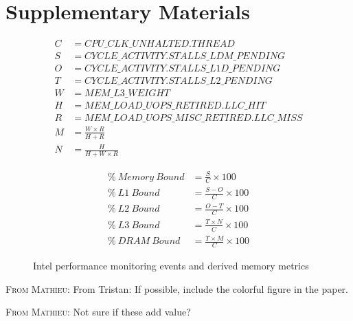 \documentclass[conference]{IEEEtran}
\newcommand{\MD}[1]{\color{magenta}\textsc{From Mathieu: }#1\color{black}}
\begin{document}
\section*{Supplementary Materials}
\begin{figure}[ht]
	\noindent
	\begin{minipage}
		{0.5\textwidth}
		\begin{align*}
			C & = CPU\_CLK\_UNHALTED.THREAD                \\
			S & = CYCLE\_ACTIVITY.STALLS\_LDM\_PENDING     \\
			O & = CYCLE\_ACTIVITY.STALLS\_L1D\_PENDING     \\
			T & = CYCLE\_ACTIVITY.STALLS\_L2\_PENDING      \\
			W & = MEM\_L3\_WEIGHT                          \\
			H & = MEM\_LOAD\_UOPS\_RETIRED.LLC\_HIT        \\
			R & = MEM\_LOAD\_UOPS\_MISC\_RETIRED.LLC\_MISS \\
			M & = \frac{W \times R}{H + R}                 \\
			N & = \frac{H}{H + W \times R}                 
		\end{align*}
	\end{minipage}
	\begin{minipage}
		{0.5\textwidth}
		\begin{align}
			\%~Memory~Bound & = \frac{S}{C} \times 100          \\
			\%~L1~Bound     & = \frac{S - O}{C} \times 100      \\
			\%~L2~Bound     & = \frac{O - T}{C} \times 100      \\
			\%~L3~Bound     & = \frac{T \times N}{C} \times 100 \\
			\%~DRAM~Bound   & = \frac{T \times M}{C} \times 100 
		\end{align}
	\end{minipage}
	\caption{Intel performance monitoring events and derived memory metrics}
	\label{fig:memory-metrics}
\end{figure}

\MD{From Tristan: If possible, include the colorful figure in the paper.}

\MD{Not sure if these add value?}
\label{sec:supplementary}
\end{document}
